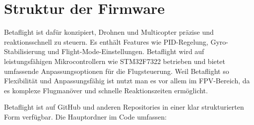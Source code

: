 \section{Struktur der Firmware}

Betaflight ist dafür konzipiert, Drohnen und Multicopter präzise und reaktionsschnell zu steuern. Es enthält Features wie PID-Regelung, Gyro-Stabilisierung und Flight-Mode-Einstellungen. Betaflight wird auf leistungsfähigen Mikrocontrollern wie STM32F7322 betrieben und bietet umfassende Anpassungsoptionen für die Flugsteuerung.
Weil Betaflight so  Flexibilität und Anpassungsfähig ist nutzt man es vor allem im FPV-Bereich, da es komplexe Flugmanöver und schnelle Reaktionszeiten ermöglicht.

Betaflight ist auf GitHub\cite{GitHubBetaflight} und anderen Repositories in einer klar strukturierten Form verfügbar. Die Hauptordner im Code umfassen:
